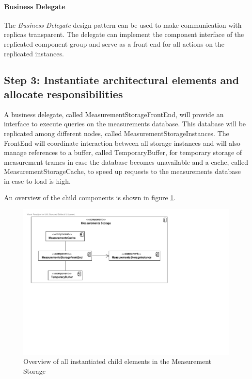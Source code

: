 \paragraph{Business Delegate}

\npar The \emph{Business Delegate} design pattern
\citep[see][p.~292]{Buschmann:07} can be used to make communication with
replicas transparent. The delegate can implement the component interface of the
replicated component group and serve as a front end for all actions on the
replicated instances.

\subsection{Step 3: Instantiate architectural elements and allocate responsibilities}
\label{add:it4/elements}

\npar A business delegate, called MeasurementStorageFrontEnd, will provide an
interface to execute queries on the measurements database. This database will be
replicated among different nodes, called MeasurementStorageInstances. The
FrontEnd will coordinate interaction between all storage instances and will also
manage references to a buffer, called TemporaryBuffer, for temporary storage of
measurement trames in case the database becomes unavailable and a cache, called
MeasurementStorageCache, to speed up requests to the measurements database in
case to load is high.

\npar An overview of the child components is shown in figure
\ref{fig:it4/elements}.

\begin{figure}[H]
	\begin{centering}
		\includegraphics[width=\textwidth]{figs/add-it4-elements.pdf}
		\caption{Overview of all instantiated child elements in the Measurement
		Storage}
		\label{fig:it4/elements}
	\end{centering}
\end{figure}

